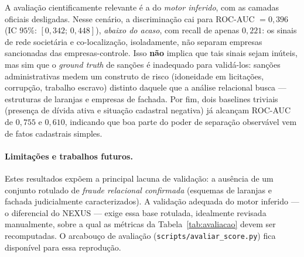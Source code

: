 A avaliação cientificamente relevante é a do \emph{motor inferido}, com as
camadas oficiais desligadas. Nesse cenário, a discriminação cai para
ROC-AUC $=0{,}396$ (IC $95\%$: $[0{,}342;\,0{,}448]$), \emph{abaixo do
acaso}, com recall de apenas $0{,}221$: os sinais de rede societária e
co-localização, isoladamente, não separam empresas sancionadas das
empresas-controle. Isso \textbf{não} implica que tais sinais sejam inúteis,
mas sim que o \textit{ground truth} de sanções é inadequado para validá-los:
sanções administrativas medem um construto de risco (idoneidade em
licitações, corrupção, trabalho escravo) distinto daquele que a análise
relacional busca --- estruturas de laranjas e empresas de fachada. Por fim,
dois baselines triviais (presença de dívida ativa e situação cadastral
negativa) já alcançam ROC-AUC de $0{,}755$ e $0{,}610$, indicando que boa
parte do poder de separação observável vem de fatos cadastrais simples.

\paragraph{Limitações e trabalhos futuros.} Estes resultados expõem a
principal lacuna de validação: a ausência de um conjunto rotulado de
\emph{fraude relacional confirmada} (esquemas de laranjas e fachada
judicialmente caracterizados). A validação adequada do motor inferido --- o
diferencial do NEXUS --- exige essa base rotulada, idealmente revisada
manualmente, sobre a qual as métricas da Tabela~\ref{tab:avaliacao} devem ser
recomputadas. O arcabouço de avaliação (\texttt{scripts/avaliar\_score.py})
fica disponível para essa reprodução.
